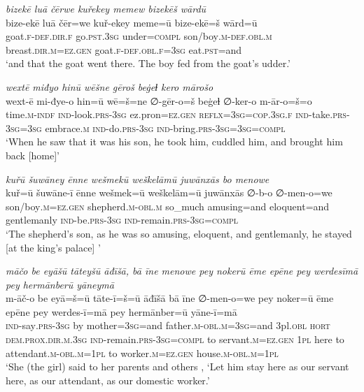 \ea \label{KŠ.31}
\textit{bizekē luā čērwe kuřekey memew bizekēš wārdū} \\ 
\gll bize-ekē luā čēr=we kuř-ekey meme=ū bize-ekē=š wārd=ū \\ 
 goat\textsc{.f}\textsc{-def}\textsc{.dir}\textsc{.f} go\textsc{.pst}\textsc{.3sg} under\textsc{=compl} son/boy\textsc{.m}\textsc{-def}\textsc{.obl}\textsc{.m} breast\textsc{.dir}\textsc{.m}\textsc{=ez.gen} goat\textsc{.f}\textsc{-def}\textsc{.obl}\textsc{.f}\textsc{=3sg} eat\textsc{.pst}=and \\ 
\glt `and that the goat went there. The boy fed from the goat’s udder.'
\z 
 
\ea \label{KŠ.32}
\textit{wextē miđyo hinū wēšne gēroš beġeɫ kero mārošo} \\ 
\gll wext-ē mi-đye-o hin=ū wē=š=ne ∅-gēr-o=š beġeɫ ∅-ker-o m-ār-o=š=o \\ 
 time\textsc{.m}\textsc{-indf} \textsc{ind-}look\textsc{.prs}\textsc{-3sg} ez.pron\textsc{=ez.gen} \textsc{reflx}\textsc{=3sg}\textsc{=cop}\textsc{.3sg}\textsc{.f} \textsc{ind-}take\textsc{.prs}\textsc{-3sg}\textsc{=3sg} embrace\textsc{.m} \textsc{ind-}do\textsc{.prs}\textsc{-3sg} \textsc{ind-}bring\textsc{.prs}\textsc{-3sg}\textsc{=3sg}\textsc{=compl} \\ 
\glt `When he saw that it was his son, he took him, cuddled him, and brought him back [home]'
\z 
 
\ea \label{KŠ.42}
\textit{kuřū šuwāney ēnne wešmekū weškelāmū juwānxās bo menowe} \\ 
\gll kuř=ū šuwāne-ī ēnne wešmek=ū weškelām=ū juwānxās ∅-b-o ∅-men-o=we \\ 
 son/boy\textsc{.m}\textsc{=ez.gen} shepherd\textsc{.m}\textsc{-obl}\textsc{.m} so\_much amusing=and eloquent=and gentlemanly \textsc{ind-}be\textsc{.prs}\textsc{-3sg} \textsc{ind-}remain\textsc{.prs}\textsc{-3sg}\textsc{=compl} \\ 
\glt `The shepherd’s son, as he was so amusing, eloquent, and gentlemanly, he stayed [at the king’s palace] '
\z 
 
\ea \label{KŠ.43}
\textit{māčo be eyāšū tāteyšū āđīšā, bā īne menowe pey nokerū ēme epēne pey werdesīmā pey hermānberū yāneymā} \\ 
\gll m-āč-o be eyā=š=ū tāte-ī=š=ū āđīšā bā īne ∅-men-o=we pey noker=ū ēme epēne pey werdes-ī=mā pey hermānber=ū yāne-ī=mā \\ 
 \textsc{ind-}say\textsc{.prs}\textsc{-3sg} by mother\textsc{=3sg}=and father\textsc{.m}\textsc{-obl}\textsc{.m}\textsc{=3sg}=and 3pl\textsc{.obl} \textsc{hort} \textsc{dem.prox}\textsc{.dir}\textsc{.m}\textsc{.3sg} \textsc{ind-}remain\textsc{.prs}\textsc{-3sg}\textsc{=compl} to servant\textsc{.m}\textsc{=ez.gen} \textsc{1pl} here to attendant\textsc{.m}\textsc{-obl}\textsc{.m}\textsc{=\textsc{1pl}} to worker\textsc{.m}\textsc{=ez.gen} house\textsc{.m}\textsc{-obl}\textsc{.m}\textsc{=\textsc{1pl}} \\ 
\glt `She (the girl) said to her parents and others , ‘Let him stay here as our servant here, as our attendant, as our domestic worker.'
\z 
 
